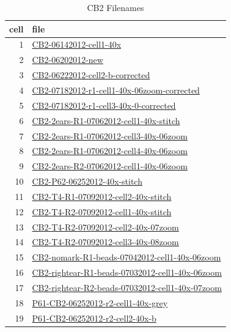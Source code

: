 \documentclass{article}
\begin{document}
\begin{table}
  \centering
  \begin{tabular}{rl}
    \toprule
    cell & file \\
    \midrule
    1& \url{CB2-06142012-cell1-40x}  \\
2& \url{CB2-06202012-new}  \\
3& \url{CB2-06222012-cell2-b-corrected}  \\
4& \url{CB2-07182012-r1-cell1-40x-06zoom-corrected}  \\
5& \url{CB2-07182012-r1-cell3-40x-0-corrected}  \\
6& \url{CB2-2ears-R1-07062012-cell1-40x-stitch}  \\
7& \url{CB2-2ears-R1-07062012-cell3-40x-06zoom}  \\
8& \url{CB2-2ears-R1-07062012-cell4-40x-06zoom}  \\
9& \url{CB2-2ears-R2-07062012-cell1-40x-06zoom}  \\
10& \url{CB2-P62-06252012-40x-stitch}  \\
11& \url{CB2-T4-R1-07092012-cell2-40x-stitch}  \\
12& \url{CB2-T4-R2-07092012-cell1-40x-stitch}  \\
13& \url{CB2-T4-R2-07092012-cell2-40x-07zoom}  \\
14& \url{CB2-T4-R2-07092012-cell3-40x-08zoom}  \\
15& \url{CB2-nomark-R1-beads-07042012-cell1-40x-06zoom}  \\
16& \url{CB2-rightear-R1-beads-07032012-cell1-40x-06zoom}  \\
17& \url{CB2-rightear-R2-beads-07032012-cell1-40x-07zoom}  \\
18& \url{P61-CB2-06252012-r2-cell1-40x-grey}  \\
19& \url{P61-CB2-06252012-r2-cell2-40x-b}  \\
\bottomrule
  \end{tabular}
  \caption{CB2 Filenames}
\end{table}

\clearpage

\begin{figure}
  \centering
  \caption{}
\end{figure}
\end{document}
